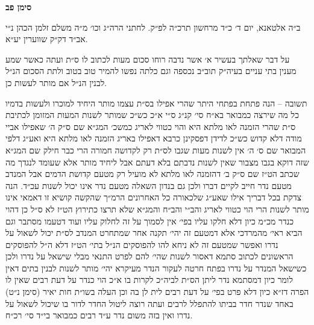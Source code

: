 \documentclass[12pt, openany]{book}
\newcommand{\chapname}{}
\newcommand{\newchap}[1]{
	\addcontentsline{toc}{chapter}{#1}
	\renewcommand{\chapname}{#1}
		\begin{center}
			\textbf{%
\fontsize{16pt}{16pt}\selectfont
				#1}
		\end{center}
}
\begin{document}
\newchap{סימן פב}
\begin{multicols}{2}
ב״ה אלטאנא, יום ד׳ כ״ד מרחשון תרכ״ה לפ״ק. לחתני הרה״ג וכו׳ מ״ה משלם זלמן הכהן נ״י אב״ד דק״ק שווערין יע״א.\\\vspace{0pt}

על דבר שאלתך בעשיר א׳ אשר נדבה רוחו סכום מעות לכתוב לו ס״ת ועתה כאשר שמע מענין בתי עניים בעיה״ק תוב״ב נכספה וגם כלתה נפשו להמיר טוב בטוב ולתת הסכום הנ״ל לבנין הנ״ל אם מותר לעשות כן.\\\vspace{0pt}

תשובה – הנה פתחת בפתחי היתר שהרי אפילו בס״ת עצמו מותר היחיד למוכרו ולעשות בדמיו כל מה שירצה כמבואר בא״ח סי׳ קנ״ג ס״י א״כ כש״כ שמותר לשנות המעות המזומן לכתיבת ס״ת שהרי הזמנה לאו מלתא היא והוי כטווי לאריג כמשכ׳ המג״א שם ס״ק ה׳ שאפילו אביי מודה דלא קדוש כש״כ לדידן דפסקינן כרבא דאפילו באריג הזמנה לאו מלתא היא ואע״ג דלפי המבואר שם ס׳ ה׳ אין לשנות מעות שגבו לס״ת רק לקדושה חמורה הרי כבר חילק שם המג״א שזה דוקא בגבו מצבור שאין לשנות נדבתם בלא דעתם אבל ליחיד מותר אלא שעומד לנגדך מה שכתב הט״ז שם ס״ק ב׳ דהזמנה לאו מלתא לא מועיל רק מטעם קדושת הדמים אבל המנדב מטעם נדר חייב לקיים דברו ולכן גם בנדון השאלה מטעם נדר אינו יכול לשנות עכ״ד. הנה צדקת בכל דבריך אילו שאע״ג שלכאורה כל האחרונים הרמ״ך שהקשה קושיא זו דאמאי אינו מותר לשנות הרי הוי כטווי לאריג והב״י והב״ח והמג״א שלא תרצו כתירוץ הט״ז לא ס״ל כן דהוי כנדר מכ״מ כיון דלא חלקו עליו בפי׳ אין לסמוך על זה לחלוק עליו ועוד דטעמו מסתבר וגם הביא ראי׳ מהמרדכי אלא דמטעם זה יהי׳ תקנה אחר שמתחרט המנדב לס״ת יכול לשאול על נדרו ואפשר שמטעם זה לא ניחא להו להפוסקים הנ״ל בתי׳ הט״ז דלא ה״ל להפוסקים הראשונים לכתוב סתמא דאסור לשנות שהי׳ להם לפרט התנאי מבלי שישאל על נדרו ולכן כשישאל המנדר על נדרו בפתח חרטה לעקור הנדר מעיקרא יהי׳ מותר לשנות לבנין בתים דאין לומר כיון דמסתמא נדר ליתן הס״ת לביה״כ לקרות בו א״כ הוי כנדר על דעת רבים שאין לו הפרה דז״א כיון דלא פרט בפי׳ על דעת רבים לית לן בה וכן העלה בשו״ת חות יאיר (סימן נ״ט) באחד שנדר חדר בביתו להתפלל לרבים ועתה רוצה ליטול החדר לדור בו שיכול לשאול על נדרו ואין בזה משום נדר ע״ד רבים כמבואר בי״ד סי׳ רכ״ח.\\\vspace{0pt}


\end{multicols}
\end{document}
